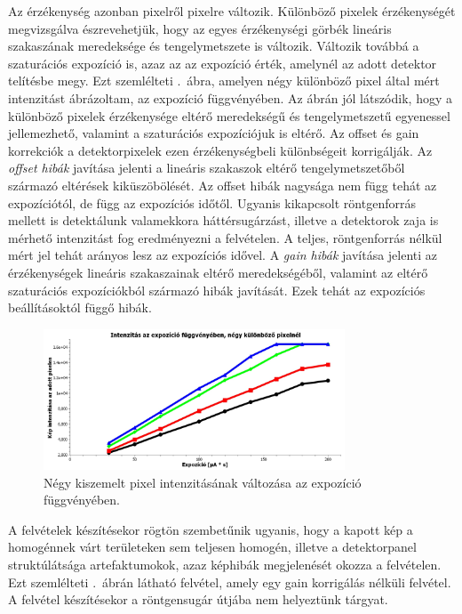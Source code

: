 \documentclass[a4paper,12pt,twoside]{article}
\begin{document}
Az érzékenység azonban pixelről pixelre változik. Különböző pixelek érzékenységét megvizsgálva észrevehetjük, hogy az egyes érzékenységi görbék lineáris szakaszának meredeksége és tengelymetszete is változik. Változik továbbá a szaturációs expozíció is, azaz az az expozíció érték, amelynél az adott detektor telítésbe megy. Ezt szemlélteti .~ábra, amelyen négy különböző pixel által mért intenzitást ábrázoltam, az expozíció függvényében. Az ábrán jól látszódik, hogy a különböző pixelek érzékenysége eltérő meredekségű és tengelymetszetű egyenessel jellemezhető, valamint a szaturációs expozíciójuk is eltérő. Az offset és gain korrekciók a detektorpixelek ezen érzékenységbeli különbségeit korrigálják. Az \emph{offset hibák} javítása jelenti a lineáris szakaszok eltérő tengelymetszetőből származó eltérések kiküszöbölését. Az offset  hibák nagysága nem függ tehát az expozíciótól, de függ az expozíciós időtől. Ugyanis kikapcsolt röntgenforrás mellett is detektálunk valamekkora háttérsugárzást, illetve a detektorok zaja is mérhető intenzitást fog eredményezni a felvételen. A teljes, röntgenforrás nélkül mért jel tehát arányos lesz az expozíciós idővel.  A \emph{gain hibák} javítása jelenti az érzékenységek lineáris szakaszainak eltérő meredekségéből, valamint az eltérő szaturációs expozíciókból származó hibák javítását. Ezek tehát az expozíciós beállításoktól függő hibák.





\begin{figure}[htbp]
\center
\includegraphics[width=0.8\textwidth]{abrak/gaingrafikon}
\caption{Négy kiszemelt pixel intenzitásának változása az expozíció függvényében.}
\label{fig:gaingrafikon}
\end{figure}



A felvételek készítésekor rögtön szembetűnik ugyanis, hogy a kapott kép a homogénnek várt területeken sem teljesen homogén, illetve a detektorpanel struktúlátsága artefaktumokok, azaz képhibák megjelenését okozza a felvételen. Ezt szemlélteti .~ábrán látható felvétel, amely egy gain korrigálás nélküli felvétel. A felvétel készítésekor a röntgensugár útjába nem helyeztünk tárgyat.
\end{document}
